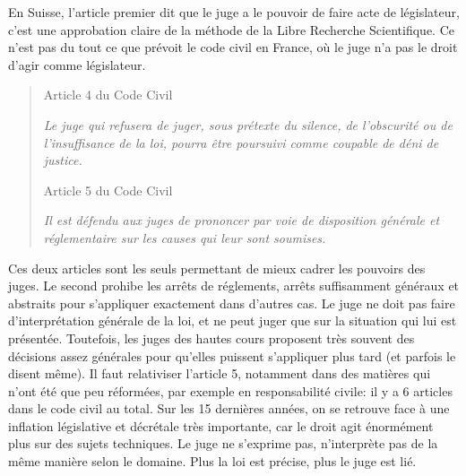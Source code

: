\documentclass[math]{cours}
\begin{document}
En Suisse, l'article premier dit que le juge a le pouvoir de faire acte de législateur, c'est une approbation claire de la méthode de la Libre Recherche Scientifique.
Ce n'est pas du tout ce que prévoit le code civil en France, où le juge n'a pas le droit d'agir comme législateur.

\begin{quote}
	\begin{center}
		Article 4 du Code Civil
	\end{center}
	{\it	Le juge qui refusera de juger, sous prétexte du silence, de l'obscurité ou de l'insuffisance de la loi, pourra être poursuivi comme coupable de déni de justice.}
	\begin{center}
		Article 5 du Code Civil
	\end{center}
	{\it	Il est défendu aux juges de prononcer par voie de disposition générale et réglementaire sur les causes qui leur sont soumises.}
\end{quote}

Ces deux articles sont les seuls permettant de mieux cadrer les pouvoirs des juges.
Le second prohibe les arrêts de réglements, arrêts suffisamment généraux et abstraits pour s'appliquer exactement dans d'autres cas.
Le juge ne doit pas faire d'interprétation générale de la loi, et ne peut juger que sur la situation qui lui est présentée.
Toutefois, les juges des hautes cours proposent très souvent des décisions assez générales pour qu'elles puissent s'appliquer plus tard (et parfois le disent même).
Il faut relativiser l'article 5, notamment dans des matières qui n'ont été que peu réformées, par exemple en responsabilité civile: il y a 6 articles dans le code civil au total.
Sur les 15 dernières années, on se retrouve face à une inflation législative et décrétale très importante, car le droit agit énormément plus sur des sujets techniques.
Le juge ne s'exprime pas, n'interprète pas de la même manière selon le domaine.
Plus la loi est précise, plus le juge est lié.
\end{document}
